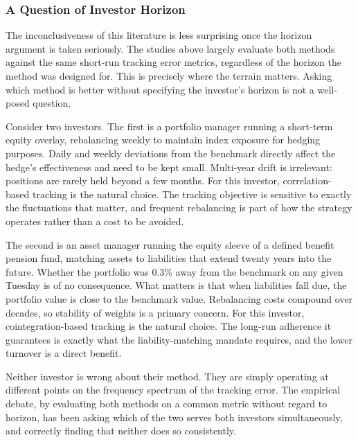 \documentclass[12pt,a4paper]{article}
\begin{document}
\subsubsection{A Question of Investor Horizon}

The inconclusiveness of this literature is less surprising once the
horizon argument is taken seriously. The studies above largely evaluate
both methods against the same short-run tracking error metrics,
regardless of the horizon the method was designed for. This is precisely
where the terrain matters. Asking which method is better without
specifying the investor's horizon is not a well-posed question.

Consider two investors. The first is a portfolio manager running a
short-term equity overlay, rebalancing weekly to maintain index exposure
for hedging purposes. Daily and weekly deviations from the benchmark
directly affect the hedge's effectiveness and need to be kept small.
Multi-year drift is irrelevant: positions are rarely held beyond a few
months. For this investor, correlation-based tracking is the natural
choice. The tracking objective is sensitive to exactly the fluctuations
that matter, and frequent rebalancing is part of how the strategy
operates rather than a cost to be avoided.

The second is an asset manager running the equity sleeve of a defined
benefit pension fund, matching assets to liabilities that extend twenty
years into the future. Whether the portfolio was 0.3\% away from the
benchmark on any given Tuesday is of no consequence. What matters is
that when liabilities fall due, the portfolio value is close to the
benchmark value. Rebalancing costs compound over decades, so stability
of weights is a primary concern. For this investor, cointegration-based
tracking is the natural choice. The long-run adherence it guarantees is
exactly what the liability-matching mandate requires, and the lower
turnover is a direct benefit.

Neither investor is wrong about their method. They are simply operating
at different points on the frequency spectrum of the tracking error.
The empirical debate, by evaluating both methods on a common metric
without regard to horizon, has been asking which of the two serves both
investors simultaneously, and correctly finding that neither does so
consistently.
\end{document}
